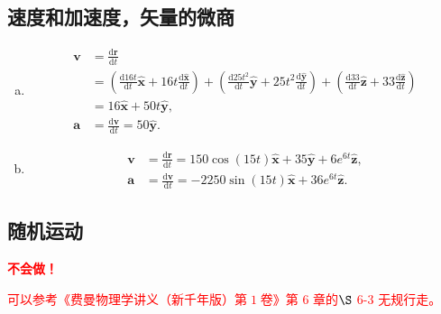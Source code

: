 \subsection{速度和加速度，矢量的微商}
\begin{enumerate}[(a)]
	\item
	\[
	\begin{aligned}
	\bm{v}
	&= \frac{\mathrm{d}\bm{r}}{\mathrm{d}t} \\
	&= \left(\frac{\mathrm{d}16t}{\mathrm{d}t}\bm{\hat{x}} + 16t\frac{\mathrm{d}\bm{\hat{x}}}{\mathrm{d}t}\right) + \left(\frac{\mathrm{d}25t^2}{\mathrm{d}t}\bm{\hat{y}} + 25t^2\frac{\mathrm{d}\bm{\hat{y}}}{\mathrm{d}t}\right) +  \left(\frac{\mathrm{d}33}{\mathrm{d}t}\bm{\hat{z}} + 33\frac{\mathrm{d}\bm{\hat{z}}}{\mathrm{d}t}\right) \\
	&= 16\bm{\hat{x}} + 50t\bm{\hat{y}}, \\
	\bm{a}
	&= \frac{\mathrm{d}\bm{v}}{\mathrm{d}t} = 50\bm{\hat{y}}.
\end{aligned}
	\]
	\item
	\[
	\begin{aligned}
	\bm{v}
	&= \frac{\mathrm{d}\bm{r}}{\mathrm{d}t} = 150\cos(15t)\bm{\hat{x}} + 35\bm{\hat{y}} + 6e^{6t}\bm{\hat{z}}, \\
	\bm{a}
	&= \frac{\mathrm{d}\bm{v}}{\mathrm{d}t} = -2250\sin(15t)\bm{\hat{x}} + 36e^{6t}\bm{\hat{z}}.
\end{aligned}
	\]
\end{enumerate}
\subsection{随机运动}
\textcolor{red}{\bfseries{不会做！}}

\textcolor{red}{可以参考《费曼物理学讲义（新千年版）第$ \; 1 \; $卷》第 6 章的$ \S $ 6-3 无规行走。}

